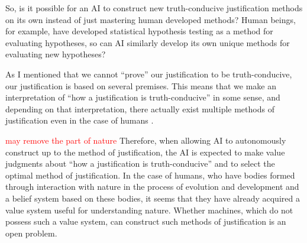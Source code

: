 So, is it possible for an AI to construct new truth-conducive justification methods on its own instead of just mastering human developed methods? Human beings, for example, have developed statistical hypothesis testing as a method for evaluating hypotheses, so can AI similarly develop its own unique methods for evaluating new hypotheses?

As I mentioned that we cannot ``prove'' our justification to be truth-conducive, our justification is based on several premises. This means that we make an interpretation of ``how a justification is truth-conducive'' in some sense, and depending on that interpretation, there actually exist multiple methods of justification even in the case of humans \cite{otsuka2022thinking}.

\textcolor{red}{may remove the part of nature}
Therefore, when allowing AI to autonomously construct up to the method of justification, the AI is expected to make value judgments about ``how a justification is truth-conducive'' and to select the optimal method of justification. In the case of humans, who have bodies formed through interaction with nature in the process of evolution and development and a belief system based on these bodies, it seems that they have already acquired a value system useful for understanding nature. Whether machines, which do not possess such a value system, can construct such methods of justification is an open problem.

